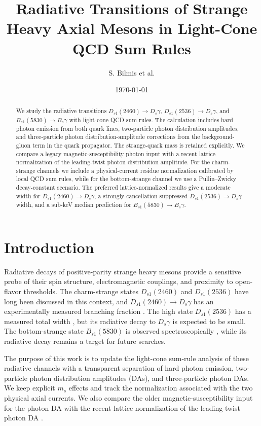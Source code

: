 \documentclass[11pt]{article}
\title{Radiative Transitions of Strange Heavy Axial Mesons in Light-Cone QCD Sum Rules}
\author{S. Bilmis et al.}
\date{\today}
\newcommand{\Ds}{D_s}
\newcommand{\Dsone}{D_{s1}}
\newcommand{\Bs}{B_s}
\newcommand{\Bsone}{B_{s1}}
\begin{document}
\maketitle

\begin{abstract}
We study the radiative transitions
$\Dsone(2460)\to\Ds\gamma$, $\Dsone(2536)\to\Ds\gamma$, and
$\Bsone(5830)\to\Bs\gamma$ with light-cone QCD sum rules.  The calculation
includes hard photon emission from both quark lines, two-particle photon
distribution amplitudes, and three-particle photon distribution-amplitude
corrections from the background-gluon term in the quark propagator.  The
strange-quark mass is retained explicitly.  We compare a legacy
magnetic-susceptibility photon input with a recent lattice normalization of the
leading-twist photon distribution amplitude.  For the charm-strange channels we
include a physical-current residue normalization calibrated by local QCD sum
rules, while for the bottom-strange channel we use a Pullin--Zwicky
decay-constant scenario.  The preferred lattice-normalized results give a
moderate width for $\Dsone(2460)\to\Ds\gamma$, a strongly cancellation
suppressed $\Dsone(2536)\to\Ds\gamma$ width, and a sub-keV median prediction
for $\Bsone(5830)\to\Bs\gamma$.
\end{abstract}

\section{Introduction}

Radiative decays of positive-parity strange heavy mesons provide a sensitive
probe of their spin structure, electromagnetic couplings, and proximity to
open-flavor thresholds.  The charm-strange states $\Dsone(2460)$ and
$\Dsone(2536)$ have long been discussed in this context, and
$\Dsone(2460)\to\Ds\gamma$ has an experimentally measured branching fraction
\cite{BaBar2006}.  The high state $\Dsone(2536)$ has a measured total width
\cite{BaBar2011}, but its radiative decay to $\Ds\gamma$ is expected to be
small.  The bottom-strange state $\Bsone(5830)$ is observed spectroscopically
\cite{CMS2018}, while its radiative decay remains a target for future searches.

The purpose of this work is to update the light-cone sum-rule analysis of
these radiative channels with a transparent separation of hard photon emission,
two-particle photon distribution amplitudes (DAs), and three-particle photon
DAs.  We keep explicit $m_s$ effects and track the normalization associated
with the two physical axial currents.  We also compare the older
magnetic-susceptibility input for the photon DA \cite{Ball:2002ps,Rohrwild2007}
with the recent lattice normalization of the leading-twist photon DA
\cite{Bacchio2024}.
\end{document}
